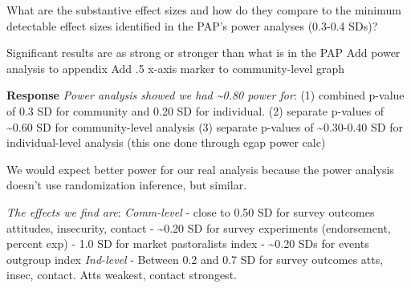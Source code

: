 \documentclass[
]{article}
\begin{document}
What are the substantive effect sizes and how do they compare to the
minimum detectable effect sizes identified in the PAP's power analyses
(0.3-0.4 SDs)?

Significant results are as strong or stronger than what is in the PAP
Add power analysis to appendix Add .5 x-axis marker to community-level
graph

\textbf{Response} \emph{Power analysis showed we had \textasciitilde0.80
power for}: (1) combined p-value of 0.3 SD for community and 0.20 SD for
individual. (2) separate p-values of \textasciitilde0.60 SD for
community-level analysis (3) separate p-values of
\textasciitilde0.30-0.40 SD for individual-level analysis (this one done
through egap power calc)

We would expect better power for our real analysis because the power
analysis doesn't use randomization inference, but similar.

\emph{The effects we find are}: \emph{Comm-level} - close to 0.50 SD for
survey outcomes attitudes, insecurity, contact - \textasciitilde0.20 SD
for survey experiments (endorsement, percent exp) - 1.0 SD for market
pastoralists index - \textasciitilde0.20 SDs for events outgroup index
\emph{Ind-level} - Between 0.2 and 0.7 SD for survey outcomes atts,
insec, contact. Atts weakest, contact strongest.
\end{document}
